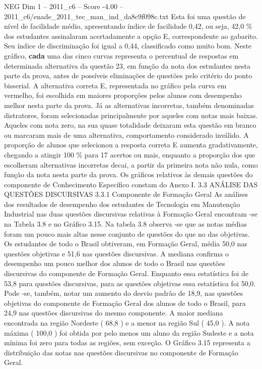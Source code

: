 \begin{textsample}{NEG Dim 1 – 2011\_c6 – Score -4.00 – 2011\_c6/enade\_2011\_tec\_man\_ind\_da8c9f098c.txt}
Esta foi uma questão de nível de facilidade médio, apresentando índice de facilidade 0,42, ou seja, 42,0 \% dos estudantes assinalaram acertadamente a opção E, correspondente ao gabarito.
Seu índice de discriminação foi igual a 0,44, classificado como muito bom.
Neste gráfico, \textbf{cada} uma das cinco curvas representa o percentual de respostas em determinada alternativa da questão 23, em função da nota dos estudantes nesta parte da prova, antes de possíveis eliminações de questões pelo critério do ponto bisserial.
A alternativa correta E, representada no gráfico pela curva em vermelho, foi escolhida em maiores proporções pelos alunos com desempenho melhor nesta parte da prova.
Já as alternativas incorretas, também denominadas distratores, foram selecionadas principalmente por aqueles com notas mais baixas.
Aqueles com nota zero, na sua quase totalidade deixaram esta questão em branco ou marcaram mais de uma alternativa, comportamento considerado inválido.
A proporção de alunos que selecionou a resposta correta E aumenta gradativamente, chegando a atingir 100 \% para 17 acertos ou mais, enquanto a proporção dos que escolheram alternativas incorretas decai, a partir da primeira nota não nula, como função da nota nesta parte da prova.
Os gráficos relativos às demais questões do componente de Conhecimento Específico constam do Anexo I. 3.3 ANÁLISE DAS QUESTÕES DISCURSIVAS 3.3.1 Componente de Formação Geral As análises dos resultados de desempenho dos estudantes de Tecnologia em Manutenção Industrial nas duas questões discursivas relativas à Formação Geral encontram -se na Tabela 3.8 e no Gráfico 3.15.
Na tabela 3.8 observa -se que as notas médias foram um pouco mais altas nesse conjunto de questões do que no das objetivas.
Os estudantes de todo o Brasil obtiveram, em Formação Geral, média 50,0 nas questões objetivas e 51,6 nas questões discursivas.
A mediana confirma o desempenho um pouco melhor dos alunos de todo o Brasil nas questões discursivas do componente de Formação Geral.
Enquanto essa estatística foi de 53,8 para questões discursivas, para as questões objetivas essa estatística foi 50,0.
Pode -se, também, notar um aumento do desvio padrão de 18,9, nas questões objetivas do componente de Formação Geral dos alunos de todo o Brasil, para 24,9 nas questões discursivas do mesmo componente.
A maior mediana encontrada na região Nordeste ( 68,8 ) e a menor na região Sul ( 45,0 ).
A nota máxima ( 100,0 ) foi obtida por pelo menos um aluno da região Sudeste e a nota mínima foi zero para todas as regiões, sem exceção.
O Gráfico 3.15 representa a distribuição das notas nas questões discursivas no componente de Formação Geral.

\end{textsample}
